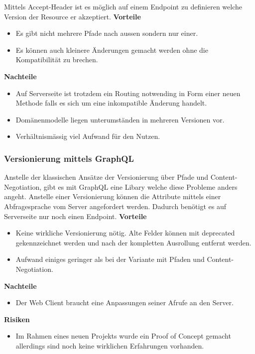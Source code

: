 Mittels Accept-Header ist es möglich auf einem Endpoint zu definieren welche Version der Resource er akzeptiert.
\newline
\newline
\textbf{Vorteile}
\begin{itemize}
	\item Es gibt nicht mehrere Pfade nach aussen sondern nur einer.
	\item Es können auch kleinere Änderungen gemacht werden ohne die Kompatibilität zu brechen.
\end{itemize}
\textbf{Nachteile}
\begin{itemize}
	\item Auf Serverseite ist trotzdem ein Routing notwending in Form einer neuen Methode falls es sich um eine inkompatible Änderung handelt.
	\item Domänenmodelle liegen unterumständen in mehreren Versionen vor.
	\item Verhältnismässig viel Aufwand für den Nutzen.
\end{itemize}

\subsubsection{Versionierung mittels GraphQL}

Anstelle der klassischen Ansätze der Versionierung über Pfade und Content-Negotiation, gibt es mit GraphQL eine Libary welche diese Probleme anders angeht. Anstelle einer Versionierung können die Attribute mittels einer Abfragesprache vom Server angefordert werden. Dadurch benötigt es auf Serverseite nur noch einen Endpoint.
\newline
\newline
\textbf{Vorteile}
\begin{itemize}
	\item Keine wirkliche Versionierung nötig. Alte Felder können mit deprecated gekennzeichnet werden und nach der kompletten Ausrollung entfernt werden.
	\item Aufwand einiges geringer als bei der Variante mit Pfaden und Content-Negotiation.
\end{itemize}
\textbf{Nachteile}
\begin{itemize}
	\item Der Web Client braucht eine Anpassungen seiner Afrufe an den Server.
\end{itemize}
\textbf{Risiken}
\begin{itemize}
	\item Im Rahmen eines neuen Projekts wurde ein Proof of Concept gemacht allerdings sind noch keine wirklichen Erfahrungen vorhanden.
\end{itemize}

